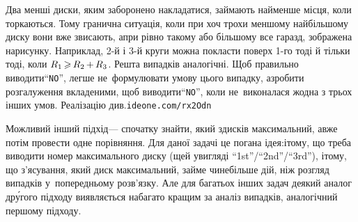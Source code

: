\Tutorial
Два менші диски, яким заборонено накладатися, займають найменше місця, коли торкаються. 
Тому гранична ситуація, коли при хоч трохи меншому найбільшому диску вони вже звисають, а\nolinebreak[3] при рівно такому або більшому все гаразд, зображена на\nolinebreak[2] рисунку. Наприклад, \mbox{2-й} і \mbox{3-й} круги можна покласти поверх \mbox{1-го} тоді й тільки тоді, коли $R_1\dib{{\>}}R_2\dib{{+}}R_3$. Решта випадків аналогічні.
Щоб правильно виводити\nolinebreak[3] ``\texttt{NO}'', легше не~формулювати умову цього випадку, а\nolinebreak[3] зробити розгалуження вкладеними, щоб виводити\nolinebreak[3] ``\texttt{NO}'', коли не~виконалася жодна з трьох інших умов.
Реалізацію див.\nolinebreak[2] \verb"ideone.com/rx2Odn"

Можливий інший підхід\nolinebreak[3] --- спочатку знайти, який з\nolinebreak[3] дисків максимальний, а\nolinebreak[3] вже потім провести одне порівняння. Для даної задачі це погана ідея:\linebreak[1] і\nolinebreak[3] тому, що треба виводити номер максимального диску (ще\nolinebreak[3] й у\nolinebreak[3] вигляді ``1st''/``2nd''/``3rd''), і\nolinebreak[3] тому, що з'ясування, який диск максимальний, займе чи\nolinebreak[3] не\nolinebreak[3] більше дій, ніж розгляд випадків у~попередньому розв'язку. Але для багатьох інших задач \mbox{деякий} аналог др\'{у}гого підходу виявляється набагато кращим за аналіз випадків, аналогічний першому підходу.
